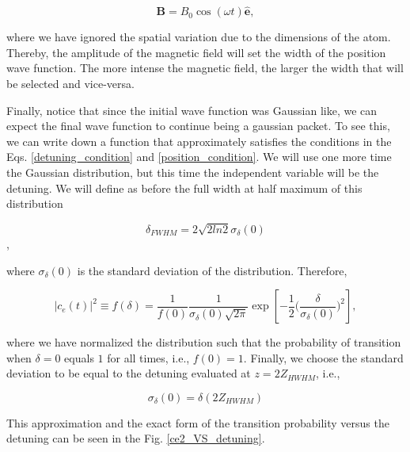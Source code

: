 \documentclass{article}
\begin{document}
\begin{equation}
    \textbf{B} =  B_{0} \cos(\omega t) \boldsymbol{\hat{e}},
\end{equation}

where we have ignored the spatial variation due to the dimensions of the atom. Thereby, the amplitude of the magnetic field will set the width of the position wave function. The more intense the magnetic field, the larger the width that will be selected and vice-versa.

Finally, notice that since the initial wave function was Gaussian like, we can expect the final wave function to continue being a gaussian packet. To see this, we can write down a function that approximately satisfies the conditions in the Eqs. \ref{detuning_condition} and \ref{position_condition}. We will use one more time the Gaussian distribution, but this time the independent variable will be the detuning. We will define as before the full width at half maximum of this distribution

\begin{equation}\label{FWHM_normal_distribution}
\delta_{FWHM} = 2\sqrt{2ln2} \sigma_{\delta}(0)
\end{equation},

where $\sigma_{\delta}(0)$ is the standard deviation of the distribution.
Therefore,

\begin{equation}\label{rabi_oscillations_approx}
  |c_{e}(t)|^{2} \equiv f(\delta) = \frac{1}{f (0)} \frac{1}{\sigma_{\delta}(0) \sqrt{2 \pi}} \exp \left[-\frac{1}{2}\bigg(\frac{\delta}{\sigma_{\delta}(0)}\bigg)^{2} \right],
\end{equation}

where we have normalized the distribution such that the probability of transition when $\delta = 0$ equals $1$ for all times, i.e., $f(0)=1$. Finally, we choose the standard deviation to be equal to the detuning evaluated at  $z=2Z_{HWHM}$, i.e.,

\begin{equation}
    \sigma_{\delta}(0) = \delta(2Z_{HWHM})
\end{equation}

This approximation and the exact form of the transition probability versus the detuning can be seen in the Fig. \ref{ce2_VS_detuning}.
\end{document}
